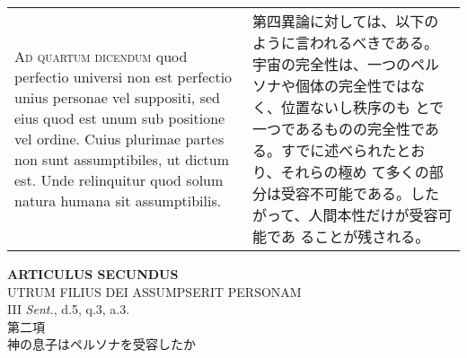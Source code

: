 \documentclass[10pt]{jsarticle} %
\begin{document}
\begin{longtable}{p{21em}p{21em}}
\\



{\scshape Ad quartum dicendum} quod perfectio universi non est perfectio unius
personae vel suppositi, sed eius quod est unum sub positione vel
ordine. Cuius plurimae partes non sunt assumptibiles, ut dictum
est. Unde relinquitur quod solum natura humana sit assumptibilis.


&

第四異論に対しては、以下のように言われるべきである。
宇宙の完全性は、一つのペルソナや個体の完全性ではなく、位置ないし秩序のも
 とで一つであるものの完全性である。すでに述べられたとおり、それらの極め
 て多くの部分は受容不可能である。したがって、人間本性だけが受容可能であ
 ることが残される。

\end{longtable}
\newpage



\begin{center}
 {\Large {\bf ARTICULUS SECUNDUS}}\\
 {\large UTRUM FILIUS DEI ASSUMPSERIT PERSONAM}\\
 {\footnotesize III {\itshape Sent.}, d.5, q.3, a.3.}\\
 {\Large 第二項\\神の息子はペルソナを受容したか}
\end{center}
\end{document}
